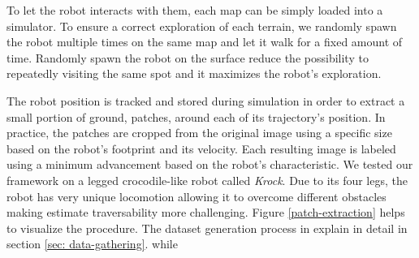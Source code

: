 \documentclass[../document.tex]{subfiles}
\begin{document}
To let the robot interacts with them, each map can be simply loaded into a simulator. To ensure a correct exploration of each terrain, we randomly spawn the robot multiple times on the same map and let it walk for a fixed amount of time. Randomly spawn the robot on the surface reduce the possibility to repeatedly visiting the same spot and it maximizes the robot's exploration.

The robot position is tracked and stored during simulation in order to extract a small portion of ground, patches, around each of its trajectory's position. In practice, the patches are cropped from the original image using a specific size based on the robot's footprint and its velocity. Each resulting image is labeled using a minimum advancement based on the robot's characteristic. We tested our framework on a legged crocodile-like robot called \emph{Krock}. Due to its four legs, the robot has very unique locomotion allowing it to overcome different obstacles making estimate traversability more challenging. Figure \ref{patch-extraction} helps to visualize the procedure. The dataset generation process in explain in detail in section \ref{sec: data-gathering}. while 
\end{document}
